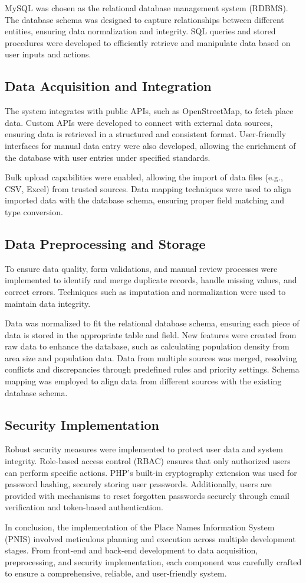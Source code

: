 MySQL was chosen as the relational database management system (RDBMS). The database schema was designed to capture relationships between different entities, ensuring data normalization and integrity. SQL queries and stored procedures were developed to efficiently retrieve and manipulate data based on user inputs and actions.

\subsection{Data Acquisition and Integration}
The system integrates with public APIs, such as OpenStreetMap, to fetch place data. Custom APIs were developed to connect with external data sources, ensuring data is retrieved in a structured and consistent format. User-friendly interfaces for manual data entry were also developed, allowing the enrichment of the database with user entries under specified standards.

Bulk upload capabilities were enabled, allowing the import of data files (e.g., CSV, Excel) from trusted sources. Data mapping techniques were used to align imported data with the database schema, ensuring proper field matching and type conversion.

\subsection{Data Preprocessing and Storage}
To ensure data quality, form validations, and manual review processes were implemented to identify and merge duplicate records, handle missing values, and correct errors. Techniques such as imputation and normalization were used to maintain data integrity.

Data was normalized to fit the relational database schema, ensuring each piece of data is stored in the appropriate table and field. New features were created from raw data to enhance the database, such as calculating population density from area size and population data. Data from multiple sources was merged, resolving conflicts and discrepancies through predefined rules and priority settings. Schema mapping was employed to align data from different sources with the existing database schema.

\subsection{Security Implementation}
Robust security measures were implemented to protect user data and system integrity. Role-based access control (RBAC) ensures that only authorized users can perform specific actions. PHP's built-in cryptography extension was used for password hashing, securely storing user passwords. Additionally, users are provided with mechanisms to reset forgotten passwords securely through email verification and token-based authentication.

In conclusion, the implementation of the Place Names Information System (PNIS) involved meticulous planning and execution across multiple development stages. From front-end and back-end development to data acquisition, preprocessing, and security implementation, each component was carefully crafted to ensure a comprehensive, reliable, and user-friendly system.